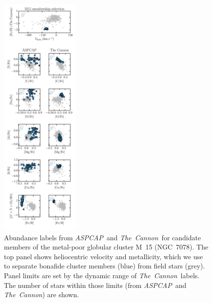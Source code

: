\documentclass[12pt,preprint]{aastex}
\newcommand{\project}[1]{\textsl{#1}}
\newcommand{\TheCannon}{\project{The~Cannon}}
\newcommand{\acronym}[1]{{\small{#1}}}
\newcommand{\aspcap}{\project{\acronym{ASPCAP}}}
\begin{document}
\begin{figure}[p]
\centering
\includegraphics[width=0.35\textwidth]{M15_comparison.pdf}
\caption{Abundance labels from \aspcap\ and \TheCannon\ for candidate
members of the metal-poor globular cluster M~15 (NGC~7078).  The top panel
shows heliocentric velocity and metallicity, which we use to separate
bonafide cluster members (blue) from field stars (grey). Panel limits
are set by the dynamic range of \TheCannon\ labels.  The number of stars
within those limits (from \aspcap\ and \TheCannon) are shown.\label{fig:m15-comparison}}
\end{figure}

\clearpage
\end{document}
